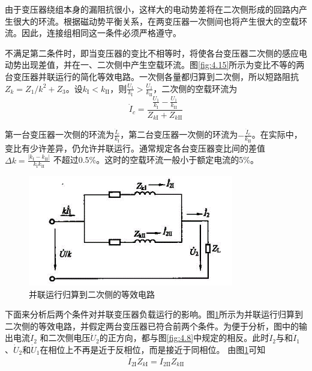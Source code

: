 \documentclass{book}
\begin{document}
由于变压器绕组本身的漏阻抗很小，这样大的电动势差将在二次侧形成的回路内产生很大的环流。根据磁动势平衡关系，在两变压器一次侧间也将产生很大的空载环流。因此，连接组相同这一条件必须严格遵守。

不满足第二条件时，即当变压器的变比不相等时，将使各台变压器二次侧的感应电动势出现差值，并在一、二次侧中产生空载环流。图\ref{fig:4.15}所示为变比不等的两台变压器并联运行的简化等效电路。一次侧各量都归算到二次侧，所以短路阻抗${{Z}_{k}}={{Z}_{1}}/{{k}^{2}}+{{Z}_{3}}$。设${{k}_{\text{I}}}<{{k}_{\text{II}}}$，则$\frac{{{U}_{1}}}{{{k}_{\text{I}}}}>\frac{{{U}_{1}}}{{{k}_{\text{II}}}}$，二次侧的空载环流为
\begin{equation}
{{\dot{I}}_{c}}=\frac{\frac{{{U}_{1}}}{{{k}_{\text{I}}}}-\frac{{{U}_{1}}}{{{k}_{\text{II}}}}}{{{Z}_{k\text{I}}}+{{Z}_{k\text{II}}}}
\label{4-4}
\end{equation}

第一台变压器一次侧的环流为$\frac{{{{\dot{I}}}_{c}}}{{{k}_{\text{I}}}}$，第二台变压器一次侧的环流为$-\frac{{{{\dot{I}}}_{c}}}{{{k}_{\text{II}}}}$。在实际中，变比有少许差异，仍允许并联运行。通常规定各台变压器变比间的差值$\Delta k=\frac{\left| {{k}_{\text{I}}}-{{k}_{\text{II}}} \right|}{{{k}_{\text{I}}}{{k}_{\text{II}}}}$ 不超过0.5\%。这时的空载环流一般小于额定电流的5\%。

\begin{figure}[H]
	\centering
	\includegraphics[width=0.80\textwidth]{4-16.png}
	\caption{并联运行归算到二次侧的等效电路}
	\label{fig_4.16}
\end{figure}

下面来分析后两个条件对并联变压器负载运行的影响。图\ref{fig_4.16}所示为并联运行归算到二次侧的等效电路，并假定两台变压器已符合前两个条件。为便于分析，图中的输出电流${{\dot{I}}_{2}}$ 和二次侧电压${{\dot{U}}_{2}}$的正方向，都与图\ref{fig:4.8}中规定的相反。此时${{\dot{I}}_{2}}$与和${{\dot{I}}_{1}}$、${{\dot{U}}_{2}}$和${{\dot{U}}_{1}}$在相位上不再是近于反相位，而是接近于同相位。
由图\ref{fig_4.16}可知
\begin{equation}
{{\dot{I}}_{2\text{I}}}{{Z}_{k\text{I}}}={{\dot{I}}_{2\text{II}}}{{Z}_{k\text{II}}}
\label{4-5}
\end{equation}
\end{document}
